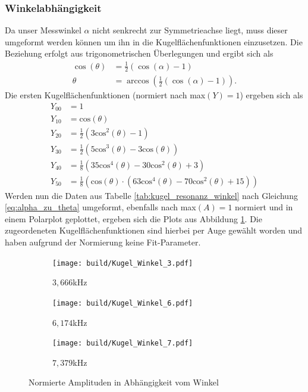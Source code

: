 \subsubsection{Winkelabhängigkeit}
Da unser Messwinkel $\alpha$ nicht senkrecht zur Symmetrieachse liegt, muss dieser umgeformt werden können um ihn in die Kugelflächenfunktionen einzusetzen.
Die Beziehung erfolgt aus trigonometrischen Überlegungen und ergibt sich als 
\begin{align}
  \cos(\theta)&=\frac{1}{2}\left(\cos(\alpha)-1\right)\nonumber\\
  \theta&=\arccos\left(\frac{1}{2} \left(\cos(\alpha)-1\right)\right).\label{eq:alpha_zu_theta}
\end{align}
Die ersten Kugelflächenfunktionen (normiert nach max$(Y)=1$) ergeben sich als
\begin{align}
  Y_{00} &= 1\\
  Y_{10} &= \text{cos}(\theta)\\
  Y_{20} &= \frac{1}{2}(3\text{cos}^2(\theta)-1) \\
  Y_{30} &= \frac{1}{2}(5\text{cos}^3(\theta)-3\text{cos}(\theta))\\
  Y_{40} &= \frac{1}{8}(35\text{cos}^4(\theta)-30\text{cos}^2(\theta)+3)\\
  Y_{50} &= \frac{1}{8}(\text{cos}(\theta)\cdot(63\text{cos}^4(\theta)-70\text{cos}^2(\theta)+15))
\end{align}
Werden nun die Daten aus Tabelle \ref{tab:kugel_resonanz_winkel} nach Gleichung \eqref{eq:alpha_zu_theta} umgeformt, ebenfalls nach max$(A)=1$ normiert
und in einem Polarplot geplottet, ergeben sich die Plots aus Abbildung \ref{fig:kugel_resonanz_winkel}.
Die zugeordeneten Kugelflächenfunktionen sind hierbei per Auge gewählt worden und haben aufgrund der Normierung keine Fit-Parameter.

\begin{figure}
  \centering
  \begin{subfigure}{0.32\textwidth}
    \centering
    \texttt{[image: build/Kugel\_Winkel\_3.pdf]}
    \caption{$3,666$kHz}
  \end{subfigure}
  \begin{subfigure}{0.32\textwidth}
    \centering
    \texttt{[image: build/Kugel\_Winkel\_6.pdf]}
    \caption{$6,174$kHz}
  \end{subfigure}
  \begin{subfigure}{0.32\textwidth}
    \centering
    \texttt{[image: build/Kugel\_Winkel\_7.pdf]}
    \caption{$7,379$kHz}
  \end{subfigure}
  \caption{Normierte Amplituden in Abhängigkeit vom Winkel \theta}
  \label{fig:kugel_resonanz_winkel}
\end{figure}

